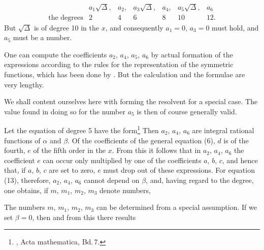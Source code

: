 
\[
\begin{array}{lcccccc}
 & a_1\sqrt{\Delta}, & a_2, & a_3\sqrt{\Delta}, & a_4, & a_5\sqrt{\Delta}, & a_6\\
\text{the degrees} & 2 & 4 & 6 & 8 & 10 & 12.
\end{array}
\]
But $\sqrt{\Delta}$ is of degree 10 in the $x$, and consequently $a_1=0$,
$a_3=0$ must hold, and $a_5$ must be a number.

One can compute the coefficients $a_2$, $a_4$, $a_5$, $a_6$ by actual
formation of the expressions according to the rules for the representation of the symmetric
functions, which has been done by . But the calculation and the formulae are very
lengthy.

We shall content ourselves here with forming the resolvent for
a special case. The value found in doing so
for the number $a_5$ is then of course generally valid.

Let the equation of degree 5 have the 
form\footnote{, Acta mathematica, Bd.\,7.}
Then $a_2$, $a_4$, $a_6$ are integral rational functions of $\alpha$ and $\beta$.
Of the coefficients of the general equation (6), $d$ is of
the fourth, $e$ of the fifth order in the $x$. From this it follows that
in $a_2$, $a_4$, $a_6$ the coefficient $e$ can occur only multiplied by one of the coefficients
$a$, $b$, $c$, and hence that, if $a$, $b$, $c$
are set to zero, $e$ must drop out of these expressions.
For equation (13), therefore, $a_2$, $a_4$, $a_6$ cannot depend
on $\beta$, and, having regard to the degree, one obtains, if
$m$, $m_1$, $m_2$, $m_3$ denote numbers,

The numbers $m$, $m_1$, $m_2$, $m_3$ can be determined from a special
assumption. If we set $\beta=0$, then
and from this there results

